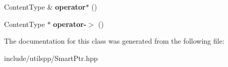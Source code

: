 \begin{DoxyCompactItemize}
\item 
\hypertarget{classutilspp_1_1SharedPtr_a6b7d293376c4faf64dbec9a49b4b4a75}{Content\-Type \& {\bfseries operator$\ast$} ()}\label{classutilspp_1_1SharedPtr_a6b7d293376c4faf64dbec9a49b4b4a75}

\item 
\hypertarget{classutilspp_1_1SharedPtr_a9e5c54eb5816839c1192a1d7a309de4f}{Content\-Type $\ast$ {\bfseries operator-\/$>$} ()}\label{classutilspp_1_1SharedPtr_a9e5c54eb5816839c1192a1d7a309de4f}

\end{DoxyCompactItemize}


The documentation for this class was generated from the following file\-:\begin{DoxyCompactItemize}
\item 
include/utilspp/Smart\-Ptr.\-hpp\end{DoxyCompactItemize}
